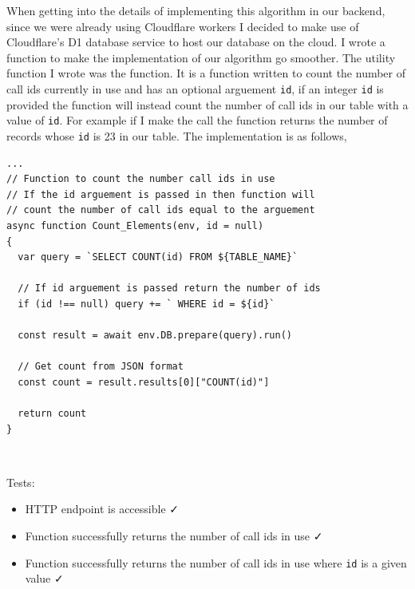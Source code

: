 \mdseries

When getting into the details of implementing this algorithm 
in our backend, since we were already using Cloudflare workers
I decided to make use of Cloudflare's D1 database service to 
host our database on the cloud. I wrote a function
to make the implementation of our algorithm go smoother. The 
utility function I wrote was the  function.
It is a function written to count the number of call ids 
currently in use and has an optional arguement \texttt{id}, if 
an integer \texttt{id} is provided the function will instead
count the number of call ids in our table with a value of 
\texttt{id}. For example if I make the call 
 the function returns the number of 
records whose \texttt{id} is 23 in our table. The implementation
is as follows,

\begin{verbatim}
...
// Function to count the number call ids in use
// If the id arguement is passed in then function will
// count the number of call ids equal to the arguement
async function Count_Elements(env, id = null)
{
  var query = `SELECT COUNT(id) FROM ${TABLE_NAME}`

  // If id arguement is passed return the number of ids
  if (id !== null) query += ` WHERE id = ${id}`

  const result = await env.DB.prepare(query).run()

  // Get count from JSON format
  const count = result.results[0]["COUNT(id)"]

  return count
}
\end{verbatim}

{\color{gray} \hrulefill} \\ \vspace{0.2cm}

{\sffamily Tests:}

\begin{itemize}
  \item HTTP endpoint is accessible \faCheck \\
  \item Function successfully returns the number of call ids in use \faCheck \\
  \item Function successfully returns the number of call ids in use where \texttt{id} is a given value \faCheck \\
\end{itemize}

